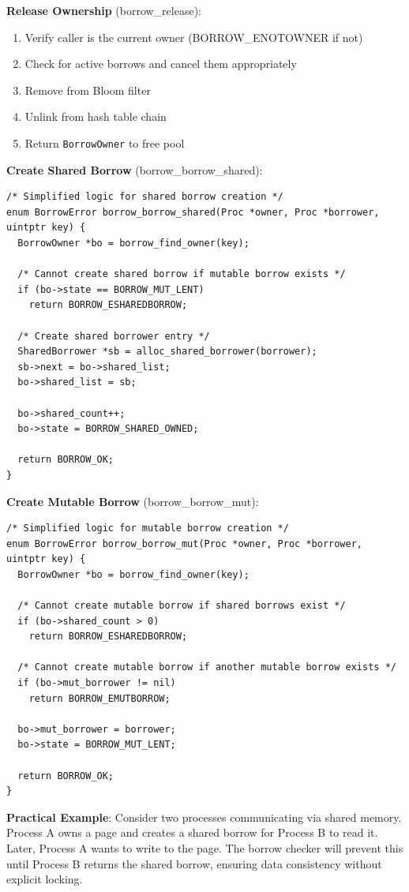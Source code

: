 \documentclass[11pt,letterpaper]{article}
\begin{document}
\textbf{Release Ownership} (borrow\_release):

\begin{enumerate}
\item Verify caller is the current owner (BORROW\_ENOTOWNER if not)
\item Check for active borrows and cancel them appropriately
\item Remove from Bloom filter
\item Unlink from hash table chain
\item Return \texttt{BorrowOwner} to free pool
\end{enumerate}

\textbf{Create Shared Borrow} (borrow\_borrow\_shared):

\begin{lstlisting}
/* Simplified logic for shared borrow creation */
enum BorrowError borrow_borrow_shared(Proc *owner, Proc *borrower, uintptr key) {
  BorrowOwner *bo = borrow_find_owner(key);
  
  /* Cannot create shared borrow if mutable borrow exists */
  if (bo->state == BORROW_MUT_LENT)
    return BORROW_ESHAREDBORROW;
  
  /* Create shared borrower entry */
  SharedBorrower *sb = alloc_shared_borrower(borrower);
  sb->next = bo->shared_list;
  bo->shared_list = sb;
  
  bo->shared_count++;
  bo->state = BORROW_SHARED_OWNED;
  
  return BORROW_OK;
}
\end{lstlisting}

\textbf{Create Mutable Borrow} (borrow\_borrow\_mut):

\begin{lstlisting}
/* Simplified logic for mutable borrow creation */
enum BorrowError borrow_borrow_mut(Proc *owner, Proc *borrower, uintptr key) {
  BorrowOwner *bo = borrow_find_owner(key);
  
  /* Cannot create mutable borrow if shared borrows exist */
  if (bo->shared_count > 0)
    return BORROW_ESHAREDBORROW;
  
  /* Cannot create mutable borrow if another mutable borrow exists */
  if (bo->mut_borrower != nil)
    return BORROW_EMUTBORROW;
  
  bo->mut_borrower = borrower;
  bo->state = BORROW_MUT_LENT;
  
  return BORROW_OK;
}
\end{lstlisting}

\textbf{Practical Example}: Consider two processes communicating via shared memory. Process A owns a page and creates a shared borrow for Process B to read it. Later, Process A wants to write to the page. The borrow checker will prevent this until Process B returns the shared borrow, ensuring data consistency without explicit locking.
\end{document}

